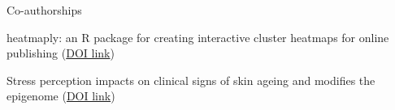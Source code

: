 


\begin{cventries}


\cventry
{Co-authorships} %
{} %
{} %
{} %
{ %
\begin{cvitems}
\item {heatmaply: an R package for creating interactive cluster heatmaps for online publishing (\href{https://doi.org/10.1093/bioinformatics/btx657}{DOI link})}
\item {Stress perception impacts on clinical signs of skin ageing and modifies the epigenome (\href{http://dx.doi.org/10.1016/j.jid.2016.06.079}{DOI link})}
\end{cvitems}
}


\end{cventries}